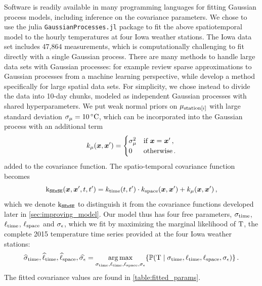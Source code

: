 \documentclass[12pt]{article}
\begin{document}
Software is readily available in many programming languages for fitting Gaussian process models, including inference on the covariance parameters. We chose to use the julia \texttt{GaussianProcesses.jl} package to fit the above spatiotemporal model to the hourly temperatures at four Iowa weather stations.
The Iowa data set includes 47,864 measurements, which is computationally challenging to fit directly with a single Gaussian process.
There are many methods to handle large data sets with Gaussian processes: for example \citet{quinonero2007approximation} review sparse approximations to Gaussian processes from a machine learning perspective, while \citet{banerjee2008gaussian} develop a method specifically for large spatial data sets.
For simplicity, we chose instead to divide the data into 10-day chunks, modeled as independent Gaussian processes with shared hyperparameters.
We put weak normal priors on \(\mu_{\mathrm{station}\left\lbrack i\right\rbrack}\) with large standard deviation \(\sigma_{\mu}=10\,{}^{\circ}\mathrm{C}\), which can be incorporated into the Gaussian process with an additional term
\begin{equation}
    k_{\mu}(\bm{x}, \bm{x}') = \begin{cases}
\sigma_\mu^2 &\text{if } \bm{x} = \bm{x}'\,, \\
0 &\text{otherwise}\,.
\end{cases}
\end{equation}
added to the covariance function.
The spatio-temporal covariance function becomes
\begin{equation}
    \operatorname{k_{\mathtt{SExSE}}}(\bm{x},\bm{x}',t,t') = k_{\mathrm{time}}(t,t') \cdot k_{\mathrm{space}}(\bm{x}, \bm{x}') + k_\mu(\bm{x}, \bm{x}') \,,
    \label{eq:ksese}
\end{equation}
which we denote \(\operatorname{k_{\mathtt{SExSE}}}\) to distinguish it from the covariance functions developed later in \autoref{sec:improving_model}.
Our model thus has four free parameters, \(\sigma_{\mathrm{time}}\), \(\ell_{\mathrm{time}}\), \(\ell_{\mathrm{space}}\) and \(\sigma_{\epsilon}\), which we fit by maximizing the marginal likelihood of \(\mathrm{T}\), the complete 2015 temperature time series provided at the four Iowa weather stations:
\begin{equation}
\label{eq:optimization}
\widehat\sigma_{\subtime},\widehat\ell_{\subtime},\widehat\ell_{\subspace},\widehat\sigman = \argmax_{\sigma_{\subtime},\ell_{\subtime},\ell_{\subspace},\sigman} \cbr{ \Pr\del{ \T \mid {\sigma_{\subtime},\ell_{\subtime},\ell_{\subspace},\sigman} } }\,.
\end{equation}
The fitted covariance  values are found in \autoref{table:fitted_params}.
\end{document}
